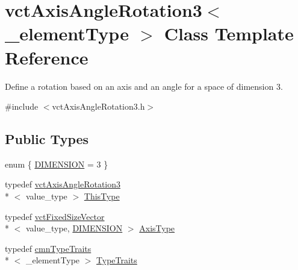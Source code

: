 \hypertarget{classvct_axis_angle_rotation3}{\section{vct\-Axis\-Angle\-Rotation3$<$ \-\_\-element\-Type $>$ Class Template Reference}
\label{classvct_axis_angle_rotation3}
}


Define a rotation based on an axis and an angle for a space of dimension 3.  




{\ttfamily \#include $<$vct\-Axis\-Angle\-Rotation3.\-h$>$}

\subsection*{Public Types}
\begin{DoxyCompactItemize}
\item 
enum \{ \hyperlink{classvct_axis_angle_rotation3_a278b4a98a62e4f5ff42ce055836240a9a778d22dfe29402d2cfdd381c1b870285}{D\-I\-M\-E\-N\-S\-I\-O\-N} = 3
 \}
\item 
typedef \hyperlink{classvct_axis_angle_rotation3}{vct\-Axis\-Angle\-Rotation3}\\*
$<$ value\-\_\-type $>$ \hyperlink{classvct_axis_angle_rotation3_af654a8037b7b82a378f69cb1bfd9b8dd}{This\-Type}
\item 
typedef \hyperlink{classvct_fixed_size_vector}{vct\-Fixed\-Size\-Vector}\\*
$<$ value\-\_\-type, \hyperlink{classvct_axis_angle_rotation3_a278b4a98a62e4f5ff42ce055836240a9a778d22dfe29402d2cfdd381c1b870285}{D\-I\-M\-E\-N\-S\-I\-O\-N} $>$ \hyperlink{classvct_axis_angle_rotation3_a3178fd901bb60bb447711b9d5f7e7aae}{Axis\-Type}
\item 
typedef \hyperlink{classcmn_type_traits}{cmn\-Type\-Traits}\\*
$<$ \-\_\-element\-Type $>$ \hyperlink{classvct_axis_angle_rotation3_a7765132e2cf950c6598eb4d75e6fc297}{Type\-Traits}
\end{DoxyCompactItemize}
